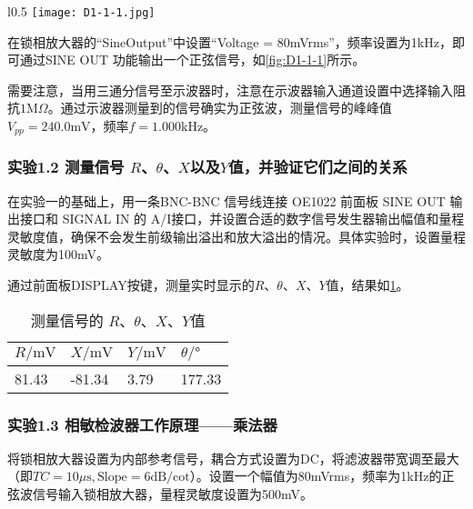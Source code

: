 \documentclass[dvipsnames, svgnames,a4paper,11pt]{article}
\begin{document}
	\begin{wrapfigure}{l}{0.5\textwidth}
		\centering
		\texttt{[image: D1-1-1.jpg]}
		\caption{用示波器观察内部信号输出}
		\label{fig:D1-1-1}
	\end{wrapfigure}

	在锁相放大器的“SineOutput”中设置“Voltage = 80mVrms”，频率设置为1kHz，即可通过SINE OUT 功能输出一个正弦信号，如\cref{fig:D1-1-1}所示。

	需要注意，当用三通分信号至示波器时，注意在示波器输入通道设置中选择输入阻抗$1\mathrm{M}\Omega$。通过示波器测量到的信号确实为正弦波，测量信号的峰峰值$V_{pp} = 240.0 \text{mV}$，频率$f = 1.000 \text{kHz}$。




	\clearpage
	\subsubsection*{实验1.2 \quad 测量信号 $R$、$\theta$、$X$以及$Y$值，并验证它们之间的关系}

	在实验一的基础上，用一条BNC-BNC 信号线连接 OE1022 前面板 SINE OUT 输出接口和 SIGNAL IN 的 A/I接口，并设置合适的数字信号发生器输出幅值和量程灵敏度值，确保不会发生前级输出溢出和放大溢出的情况。具体实验时，设置量程灵敏度为100mV。
	
	通过前面板DISPLAY按键，测量实时显示的$R$、$\theta$、$X$、$Y$值，结果如\cref{tbl:D1-2-1}。

	\begin{table}[htbp]
		\centering
		\begin{tabular}{|llll|} 
		\hline
		$R/\text{mV}$  & $X/\text{mV}$   & $Y/\text{mV}$ & $\theta/°$  \\ 
		\hline
		81.43 & -81.34 & 3.79 & 177.33   \\
		\hline
		\end{tabular}
		\caption{测量信号的 $R$、$\theta$、$X$、$Y$值}
		\label{tbl:D1-2-1}
	\end{table}





	\subsubsection*{实验1.3 \quad 相敏检波器工作原理——乘法器}

	将锁相放大器设置为内部参考信号，耦合方式设置为DC，将滤波器带宽调至最大（即$TC = 10 \mu\text{s}, \text{Slope} = 6 \text{dB/cot}$）。设置一个幅值为80mVrms，频率为1kHz的正弦波信号输入锁相放大器，量程灵敏度设置为500mV。
	
\end{document}
